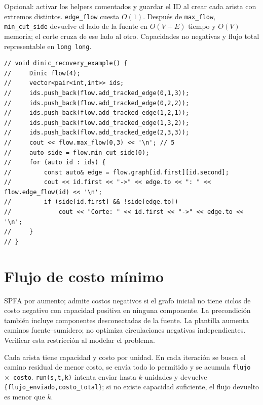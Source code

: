 
Opcional: activar los helpers comentados y guardar el ID al crear cada arista
con extremos distintos. \texttt{edge\_flow} cuesta $O(1)$. Despu\'es de
\texttt{max\_flow}, \texttt{min\_cut\_side} devuelve el lado de la fuente en
$O(V+E)$ tiempo y $O(V)$ memoria; el corte cruza de ese lado al otro.
Capacidades no negativas y flujo total representable en \texttt{long long}.

\begin{lstlisting}[style=cpp]
// void dinic_recovery_example() {
//     Dinic flow(4);
//     vector<pair<int,int>> ids;
//     ids.push_back(flow.add_tracked_edge(0,1,3));
//     ids.push_back(flow.add_tracked_edge(0,2,2));
//     ids.push_back(flow.add_tracked_edge(1,2,1));
//     ids.push_back(flow.add_tracked_edge(1,3,2));
//     ids.push_back(flow.add_tracked_edge(2,3,3));
//     cout << flow.max_flow(0,3) << '\n'; // 5
//     auto side = flow.min_cut_side(0);
//     for (auto id : ids) {
//         const auto& edge = flow.graph[id.first][id.second];
//         cout << id.first << "->" << edge.to << ": " << flow.edge_flow(id) << '\n';
//         if (side[id.first] && !side[edge.to])
//             cout << "Corte: " << id.first << "->" << edge.to << '\n';
//     }
// }
\end{lstlisting}

\section{Flujo de costo m\'inimo}

SPFA por aumento; admite costos negativos si el grafo inicial no tiene ciclos
de costo negativo con capacidad positiva en ninguna componente.
La precondici\'on tambi\'en incluye componentes desconectadas de la fuente.
La plantilla aumenta caminos fuente--sumidero; no optimiza circulaciones
negativas independientes. Verificar esta restricci\'on al modelar el problema.

Cada arista tiene capacidad y costo por unidad. En cada iteraci\'on se busca el
camino residual de menor costo, se env\'ia todo lo permitido y se acumula
\texttt{flujo $\times$ costo}. \texttt{run(s,t,k)} intenta enviar hasta $k$
unidades y devuelve \texttt{\{flujo\_enviado,costo\_total\}}; si no existe
capacidad suficiente, el flujo devuelto es menor que $k$.

